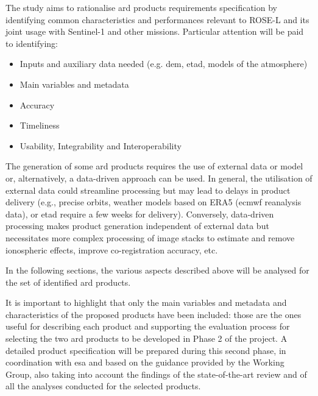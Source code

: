 The study aims to rationalise \acs{ard} products requirements specification by identifying common characteristics and performances relevant to ROSE-L and its joint usage with Sentinel-1 and other missions. Particular attention will be paid to identifying:
    \begin{itemize}
        \item Inputs and auxiliary data needed (e.g. \acs{dem}, \acs{etad}, models of the atmosphere)
    	\item Main variables and metadata
        \item Accuracy
        \item Timeliness       
        \item Usability, Integrability and Interoperability
    \end{itemize}

The generation of some \acs{ard} products requires the use of external data or model or, alternatively, a data-driven approach can be used. In general, the utilisation of external data could streamline processing but may lead to delays in product delivery (e.g., precise orbits, weather models based on ERA5 (\acs{ecmwf} reanalysis data), or \acs{etad} require a few weeks for delivery). Conversely, data-driven processing makes product generation independent of external data but necessitates more complex processing of image stacks to estimate and remove ionospheric effects, improve co-registration accuracy, etc.

In the following sections, the various aspects described above will be analysed for the set of identified \acs{ard} products.

It is important to highlight that only the main variables and metadata and characteristics of the proposed products have been included: those are the ones useful for describing each product and supporting the evaluation process for selecting the two \acs{ard} products to be developed in Phase 2 of the project. A detailed product specification will be prepared during this second phase, in coordination with \acs{esa} and based on the guidance provided by the Working Group, also taking into account the findings of the state-of-the-art review and of all the analyses conducted for the selected products.





% 



% 

% 

% 

% 

% 

% 

% 
